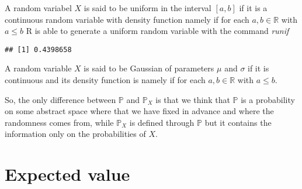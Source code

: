 	\begin{example}
		A random variabel $X$ is said to be uniform in the interval $[a,b]$ if it is a continuous random variable with density function 
		namely if for each $a, b \in\mathbb R $ with $a\leq b$ 
		R is able to generate a uniform random variable with the command \textit{runif}
\begin{knitrout}
\color{fgcolor}\begin{kframe}
\begin{alltt}
\hldef{(}\hldef{)} 
\end{alltt}
\begin{verbatim}
## [1] 0.4398658
\end{verbatim}
\end{kframe}
\end{knitrout}
	\end{example}

	\begin{example}
		\label{d:gaussian}
		A random variable $X$ is said to be Gaussian of parameters $\mu$ and $\sigma$ if it is continuous and its density function is 
		namely if 
		for each $a, b \in \mathbb R$ with $a \leq b$. 
	\end{example}


So, the only difference between $\mathbb P$ and $\mathbb P_X$ is that we think that $\mathbb P$ is a probability on some abstract space where that we have fixed in advance and where the randomness comes from, while $\mathbb P_X$ is defined through $\mathbb P$ but it contains the information only on the probabilities of $X$. 

\section{Expected value}

